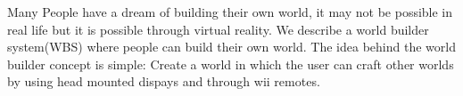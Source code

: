 Many People have a dream of building their own world, it may not be possible in real life but  it is possible through virtual reality.
We describe a world builder system(WBS) where people can build their own world.
The idea behind the world builder concept is simple: Create a world in which the user can craft other worlds by using head mounted dispays and through wii remotes.